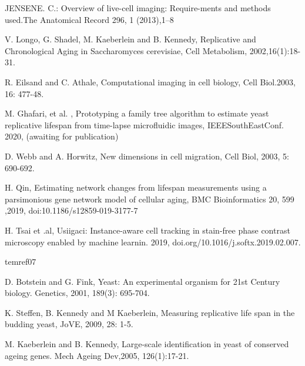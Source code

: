 \documentclass[conference]{IEEEtran}
\begin{document}
\begin{thebibliography}{00}
JENSENE. C.: Overview of live-cell imaging: Require-ments and methods used.The Anatomical Record 296, 1 (2013),1–8


V. Longo, G. Shadel, M. Kaeberlein and B.  Kennedy, Replicative and Chronological Aging in Saccharomyces cerevisiae, Cell Metabolism, 2002,16(1):18-31.




R. Eilsand and C. Athale, Computational imaging in cell biology, Cell Biol.2003, 16: 477-48.

M. Ghafari,  et al. , Prototyping a family tree algorithm to estimate yeast replicative lifespan from time-lapse microfluidic images, IEEESouthEastConf. 2020, (awaiting for publication)



D. Webb and A. Horwitz, New dimensions in cell migration, Cell Biol, 2003,  5: 690-692.


H. Qin, Estimating network changes from lifespan measurements using a parsimonious gene network model of cellular aging, BMC Bioinformatics 20, 599 ,2019, doi:10.1186/s12859-019-3177-7









H. Tsai et .al, Usiigaci: Instance-aware cell tracking in stain-free phase contrast microscopy enabled by machine learnin. 2019, doi.org/10.1016/j.softx.2019.02.007.

\bibi



tem{ref07}

D. Botstein and G. Fink, Yeast: An experimental organism for 21st Century biology. Genetics, 2001, 189(3): 695-704.



K. Steffen, B. Kennedy and M Kaeberlein, Measuring replicative life span in the budding yeast, JoVE, 2009,  28: 1-5.


M. Kaeberlein and B. Kennedy, Large-scale identification in yeast of conserved ageing genes. Mech Ageing Dev,2005, 126(1):17-21.


\end{thebibliography}
\end{document}
